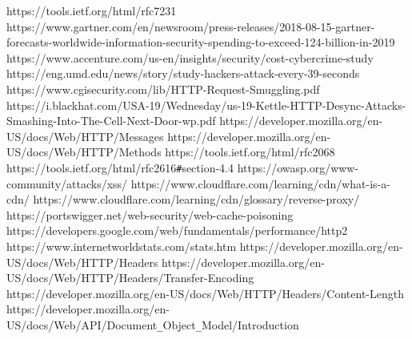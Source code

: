\documentclass[
fontsize=11pt,
paper=a4,
abstract=true,
numbers=noenddot,
listof=totoc,
bibliography=totoc,
oneside,
cleardoublepage=plain,
parskip=half+, %
BCOR=1cm, %
]{scrreprt}
\begin{document}
















\begin{thebibliography}{00}
	 https://tools.ietf.org/html/rfc7231 
	 https://www.gartner.com/en/newsroom/press-releases/2018-08-15-gartner-forecasts-worldwide-information-security-spending-to-exceed-124-billion-in-2019
	 https://www.accenture.com/us-en/insights/security/cost-cybercrime-study
	 https://eng.umd.edu/news/story/study-hackers-attack-every-39-seconds
	 https://www.cgisecurity.com/lib/HTTP-Request-Smuggling.pdf
	 https://i.blackhat.com/USA-19/Wednesday/us-19-Kettle-HTTP-Desync-Attacks-Smashing-Into-The-Cell-Next-Door-wp.pdf
	 https://developer.mozilla.org/en-US/docs/Web/HTTP/Messages
	 https://developer.mozilla.org/en-US/docs/Web/HTTP/Methods
	 https://tools.ietf.org/html/rfc2068
	 https://tools.ietf.org/html/rfc2616\verb|#|section-4.4
	 https://owasp.org/www-community/attacks/xss/
	 https://www.cloudflare.com/learning/cdn/what-is-a-cdn/
	 https://www.cloudflare.com/learning/cdn/glossary/reverse-proxy/
	 https://portswigger.net/web-security/web-cache-poisoning
	 https://developers.google.com/web/fundamentals/performance/http2
	 https://www.internetworldstats.com/stats.htm
	 https://developer.mozilla.org/en-US/docs/Web/HTTP/Headers
	 https://developer.mozilla.org/en-US/docs/Web/HTTP/Headers/Transfer-Encoding
	 https://developer.mozilla.org/en-US/docs/Web/HTTP/Headers/Content-Length
	https://developer.mozilla.org/en-US/docs/Web/API/Document\verb|_|Object\verb|_|Model/Introduction
	
\end{thebibliography}	
\end{document}
